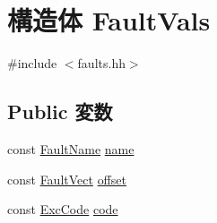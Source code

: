 \hypertarget{structMipsISA_1_1MipsFaultBase_1_1FaultVals}{
\section{構造体 FaultVals}
\label{structMipsISA_1_1MipsFaultBase_1_1FaultVals}
}


{\ttfamily \#include $<$faults.hh$>$}\subsection*{Public 変数}
\begin{DoxyCompactItemize}
\item 
const \hyperlink{sim_2faults_8hh_abb196df64725e5c2568c900cf130d8d7}{FaultName} \hyperlink{structMipsISA_1_1MipsFaultBase_1_1FaultVals_a4d488474632193509a5a7521b4cf58f4}{name}
\item 
const \hyperlink{classm5_1_1params_1_1Addr}{FaultVect} \hyperlink{structMipsISA_1_1MipsFaultBase_1_1FaultVals_adad67944c52549a8b44faffafaa9c48f}{offset}
\item 
const \hyperlink{namespaceMipsISA_abcc8a7c57cd8becefbfd621dbff5ffd4}{ExcCode} \hyperlink{structMipsISA_1_1MipsFaultBase_1_1FaultVals_a6aa6b7adf49ca7d5de189897465cfccd}{code}
\end{DoxyCompactItemize}


